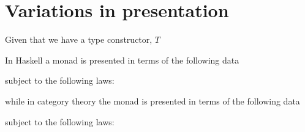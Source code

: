 \section{Variations in presentation}

Given that we have a type constructor, $T$

In Haskell a monad is presented in terms of the following data


subject to the following laws:


while in category theory the monad is presented in terms of the
following data


subject to the following laws:


